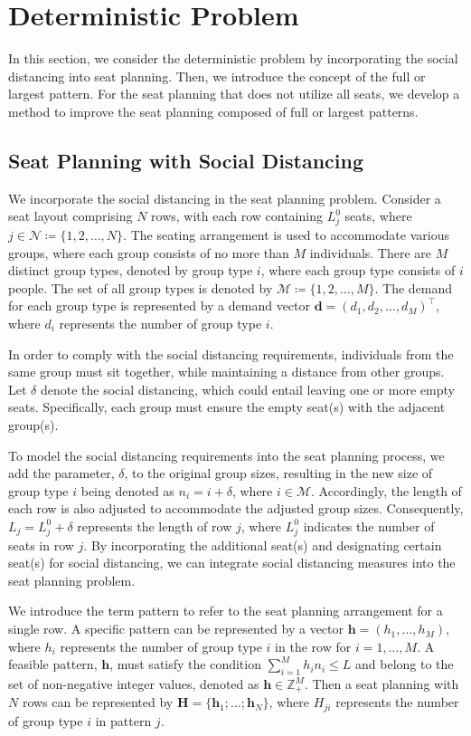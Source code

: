 \section{Deterministic Problem}
In this section, we consider the deterministic problem by incorporating the social distancing into seat planning. Then, we introduce the concept of the full or largest pattern. For the seat planning that does not utilize all seats, we develop a method to improve the seat planning composed of full or largest patterns.


\subsection{Seat Planning with Social Distancing}
We incorporate the social distancing in the seat planning problem. Consider a seat layout comprising $N$ rows, with each row containing $L_j^0$ seats, where $j \in \mathcal{N} \coloneqq \{1,2, \ldots, N\}$. The seating arrangement is used to accommodate various groups, where each group consists of no more than $M$ individuals. There are $M$ distinct group types, denoted by group type $i$, where each group type consists of $i$ people. The set of all group types is denoted by $\mathcal{M} \coloneqq \{1, 2, \ldots, M\}$. The demand for each group type is represented by a demand vector $\mathbf{d} = (d_1, d_2, \ldots, d_M)^{\intercal}$, where $d_i$ represents the number of group type $i$.


In order to comply with the social distancing requirements, individuals from the same group must sit together, while maintaining a distance from other groups. Let $\delta$ denote the social distancing, which could entail leaving one or more empty seats. Specifically, each group must ensure the empty seat(s) with the adjacent group(s).

To model the social distancing requirements into the seat planning process, we add the parameter, $\delta$, to the original group sizes, resulting in the new size of group type $i$ being denoted as $n_i = i + \delta$, where $i \in \mathcal{M}$. Accordingly, the length of each row is also adjusted to accommodate the adjusted group sizes. Consequently, $L_j = L_j^{0} + \delta$ represents the length of row $j$, where $L_j^{0}$ indicates the number of seats in row $j$. By incorporating the additional seat(s) and designating certain seat(s) for social distancing, we can integrate social distancing measures into the seat planning problem.


We introduce the term pattern to refer to the seat planning arrangement for a single row. A specific pattern can be represented by a vector $\bm{h} = (h_1, \ldots, h_M)$, where $h_i$ represents the number of group type $i$ in the row for $i = 1,\ldots, M$. A feasible pattern, $\bm{h}$, must satisfy the condition $\sum_{i=1}^{M} h_i n_i \leq L$ and belong to the set of non-negative integer values, denoted as $\bm{h} \in \mathbb{Z}_{+}^{M}$. Then a seat planning with $N$ rows can be represented by $\bm{H} = \{\bm{h}_1; \ldots; \bm{h}_N\}$, where $H_{ji}$ represents the number of group type $i$ in pattern $j$.
  
